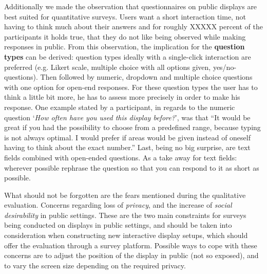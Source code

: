 	Additionally we made the observation that questionnaires on public displays are best suited for quantitative surveys. Users want a short interaction time, not having to think much about their answers and for roughly XXXXX percent of the participants it holds true, that they do not like being observed while making responses in public.
	From this observation, the implication for the \textbf{question types} can be derived: question types ideally with a single-click interaction are preferred (e.g. Likert scale, multiple choice with all options given, yes/no-questions). Then followed by numeric, dropdown and multiple choice questions with one option for open-end responses. For these question types the user has to think a little bit more, he has to assess more precisely in order to make his response. One example stated by a participant, in regards to the numeric question `\textit{How often have you used this display before?}', was that ``It would be great if you had the possibility to choose from a predefined range, because typing is not always optimal. I would prefer if areas would be given instead of oneself having to think about the exact number.'' Last, being no big surprise, are text fields combined with open-ended questions. As a take away for text fields: wherever possible rephrase the question so that you can respond to it as short as possible.


	What should not be forgotten are the fears mentioned during the qualitative evaluation. Concerns regarding loss of \textit{privacy}, and the increase of \textit{social desirability} in public settings. These are the two main constraints for surveys being conducted on displays in public settings, and should be taken into consideration when constructing new interactive display setups, which should offer the evaluation through a survey platform. Possible ways to cope with these concerns are to adjust the position of the display in public (not so exposed), and to vary the screen size depending on the required privacy.




